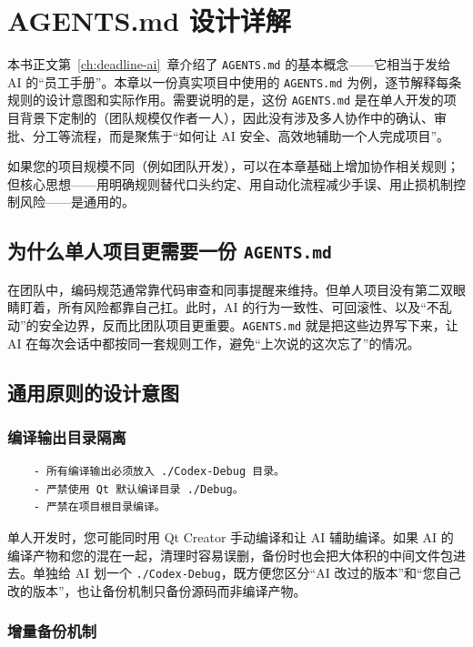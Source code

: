 \chapter{AGENTS.md 设计详解} \label{app:agents-md}

本书正文第~\ref{ch:deadline-ai}~章介绍了 \texttt{AGENTS.md} 的基本概念——它相当于发给 AI 的“员工手册”。本章以一份真实项目中使用的 \texttt{AGENTS.md} 为例，逐节解释每条规则的设计意图和实际作用。需要说明的是，这份 \texttt{AGENTS.md} 是在单人开发的项目背景下定制的（团队规模仅作者一人），因此没有涉及多人协作中的确认、审批、分工等流程，而是聚焦于“如何让 AI 安全、高效地辅助一个人完成项目”。

如果您的项目规模不同（例如团队开发），可以在本章基础上增加协作相关规则；但核心思想——用明确规则替代口头约定、用自动化流程减少手误、用止损机制控制风险——是通用的。

\section{为什么单人项目更需要一份 \texttt{AGENTS.md}}

在团队中，编码规范通常靠代码审查和同事提醒来维持。但单人项目没有第二双眼睛盯着，所有风险都靠自己扛。此时，AI 的行为一致性、可回滚性、以及“不乱动”的安全边界，反而比团队项目更重要。\texttt{AGENTS.md} 就是把这些边界写下来，让 AI 在每次会话中都按同一套规则工作，避免“上次说的这次忘了”的情况。

\section{通用原则的设计意图}

\subsection{编译输出目录隔离}

\begin{lstlisting}
	- 所有编译输出必须放入 ./Codex-Debug 目录。
	- 严禁使用 Qt 默认编译目录 ./Debug。
	- 严禁在项目根目录编译。
\end{lstlisting}

单人开发时，您可能同时用 Qt Creator 手动编译和让 AI 辅助编译。如果 AI 的编译产物和您的混在一起，清理时容易误删，备份时也会把大体积的中间文件包进去。单独给 AI 划一个 \texttt{./Codex-Debug}，既方便您区分“AI 改过的版本”和“您自己改的版本”，也让备份机制只备份源码而非编译产物。

\subsection{增量备份机制}

